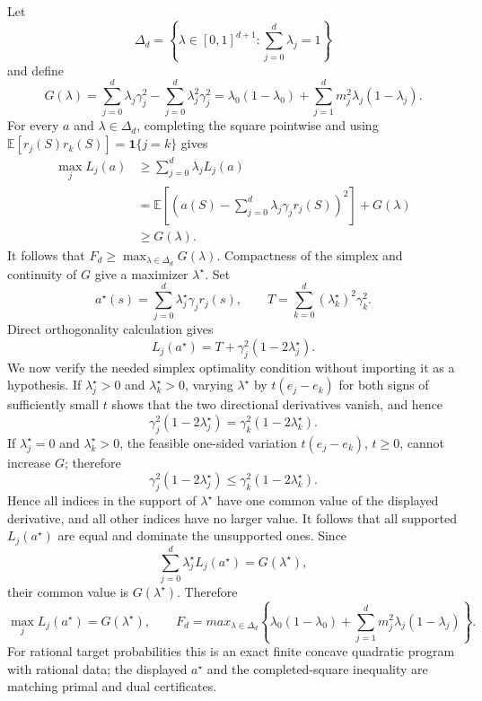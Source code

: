 Let
\[
 \Delta_d=\left\{\lambda\in[0,1]^{d+1}:
                    \sum_{j=0}^d\lambda_j=1\right\}
\]
and define
\[
 G(\lambda)=
 \sum_{j=0}^d\lambda_j\gamma_j^2-
 \sum_{j=0}^d\lambda_j^2\gamma_j^2
 =\lambda_0(1-\lambda_0)
   +\sum_{j=1}^dm_j^2\lambda_j(1-\lambda_j).
\]
For every \(a\) and \(\lambda\in\Delta_d\), completing the square pointwise and using
\(\mathbb E[r_j(S)r_k(S)]=\mathbf 1\{j=k\}\) gives
\[
 \begin{aligned}
 \max_jL_j(a)
 &\ge\sum_{j=0}^d\lambda_jL_j(a)\\
 &=\mathbb E\!\left[
       \left(a(S)-\sum_{j=0}^d\lambda_j\gamma_jr_j(S)\right)^2
     \right]+G(\lambda)\\
 &\ge G(\lambda).
 \end{aligned}
\]
It follows that \(F_d\ge\max_{\lambda\in\Delta_d}G(\lambda)\).  Compactness of the simplex and continuity of \(G\) give a maximizer \(\lambda^{\star}\).  Set
\[
 a^{\star}(s)=\sum_{j=0}^d\lambda_j^{\star}\gamma_jr_j(s),
 \qquad
 T=\sum_{k=0}^d(\lambda_k^{\star})^2\gamma_k^2.
\]
Direct orthogonality calculation gives
\[
 L_j(a^{\star})=T+\gamma_j^2(1-2\lambda_j^{\star}).
\]
We now verify the needed simplex optimality condition without importing it as a hypothesis.  If \(\lambda_j^{\star}>0\) and \(\lambda_k^{\star}>0\), varying \(\lambda^{\star}\) by \(t(e_j-e_k)\) for both signs of sufficiently small \(t\) shows that the two directional derivatives vanish, and hence
\[
 \gamma_j^2(1-2\lambda_j^{\star})
 =\gamma_k^2(1-2\lambda_k^{\star}).
\]
If \(\lambda_j^{\star}=0\) and \(\lambda_k^{\star}>0\), the feasible one-sided variation \(t(e_j-e_k)\), \(t\ge0\), cannot increase \(G\); therefore
\[
 \gamma_j^2(1-2\lambda_j^{\star})
 \le\gamma_k^2(1-2\lambda_k^{\star}).
\]
Hence all indices in the support of \(\lambda^{\star}\) have one common value of the displayed derivative, and all other indices have no larger value.  It follows that all supported \(L_j(a^{\star})\) are equal and dominate the unsupported ones.  Since
\[
 \sum_{j=0}^d\lambda_j^{\star}L_j(a^{\star})
 =G(\lambda^{\star}),
\]
their common value is \(G(\lambda^{\star})\).  Therefore
\[
 \max_jL_j(a^{\star})=G(\lambda^{\star}),
 \qquad
 F_d=max_{\lambda\in\Delta_d}
 \left\{\lambda_0(1-\lambda_0)
 +\sum_{j=1}^dm_j^2\lambda_j(1-\lambda_j)\right\}.
\]
For rational target probabilities this is an exact finite concave quadratic program with rational data; the displayed \(a^{\star}\) and the completed-square inequality are matching primal and dual certificates.

